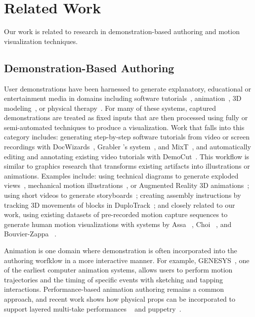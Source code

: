 
\section{Related Work}
Our work is related to research in demonstration-based authoring and motion visualization techniques.

\subsection{Demonstration-Based Authoring}

User demonstrations have been harnessed to generate explanatory, educational or entertainment media in domains including software tutorials~\cite{Bergman:2005:DocWizards,Grabler:2009jj}, animation~\cite{Barnes:2008:VideoPuppetry,held20123d}, 3D modeling~\cite{Zhang:2013:BodyAvatar}, or physical therapy~\cite{Yeager:EECS-2013-91}.
%
For many of these systems, captured demonstrations are treated as fixed inputs that are then processed using fully or semi-automated techniques to produce a visualization.
%
Work that falls into this category includes: generating step-by-step software tutorials from video or screen recordings with DocWizards~\cite{Bergman:2005:DocWizards}, Grabler \ea's system~\cite{Grabler:2009jj}, and MixT~\cite{Chi:2012:MAG:2380116.2380130}, and automatically editing and annotating existing video tutorials with DemoCut~\cite{Chi:2013:DGC:2501988.2502052}.
%
This workflow is similar to graphics research that transforms existing artifacts into illustrations or animations.
Examples include: using technical diagrams to generate exploded views~\cite{li2008automated}, mechanical motion illustrations~\cite{mitra2010illustrating}, or Augmented Reality 3D animations~\cite{Mohr:2015:RTD:2702123.2702490}; using short videos to generate storyboards~\cite{goldman2006schematic}; creating assembly instructions by tracking 3D movements of blocks in DuploTrack~\cite{Gupta2012DuploTrack}; and closely related to our work, using existing datasets of pre-recorded motion capture sequences to generate human motion visualizations with systems by Assa \ea~\cite{assa2005action,assa2008motion}, Choi \ea~\cite{choi2012retrieval}, and Bouvier-Zappa \ea~\cite{bouvier2007motion}.

Animation is one domain where demonstration is often incorporated into the authoring worfklow in a more interactive manner. For example, GENESYS~\cite{Baecker:1969:GENESYS}, one of the earliest computer animation systems, allows users to perform motion trajectories and the timing of specific events with sketching and tapping interactions. Performance-based animation authoring remains a common approach, and recent work shows how physical props can be incorporated to support layered multi-take performances ~\cite{Dontcheva:2003:LAC:1201775.882285,Gupta:2014:MotionMontage} and puppetry~\cite{Barnes:2008:VideoPuppetry,held20123d}.

